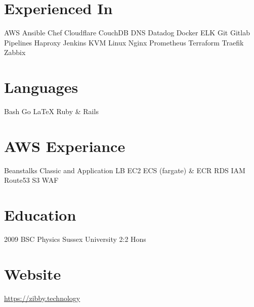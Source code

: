 \documentclass[]{friggeri-cv-a4}
\begin{document}
\fancyfoot{}

\begin{aside}
	\section{Experienced In}
    AWS
    Ansible
    Chef
    Cloudflare
    CouchDB
    DNS
    Datadog
    Docker
    ELK
    Git
    Gitlab Pipelines
    Haproxy
    Jenkins
    KVM
    Linux
    Nginx
    Prometheus
    Terraform
    Traefik
    Zabbix
  \section{Languages}
    Bash
    Go
    \LaTeX
    Ruby \& Rails
  \section{AWS Experiance}
    Beanstalks
    Classic and Application LB
    EC2
    ECS (fargate) \& ECR
    RDS
    IAM
    Route53
    S3
    WAF
  \section{Education}
    2009 BSC Physics Sussex University 2:2 Hons
  \section{Website}
    \href{https://zibby.technology}{https://zibby.technology}
\end{aside}
\end{document}
